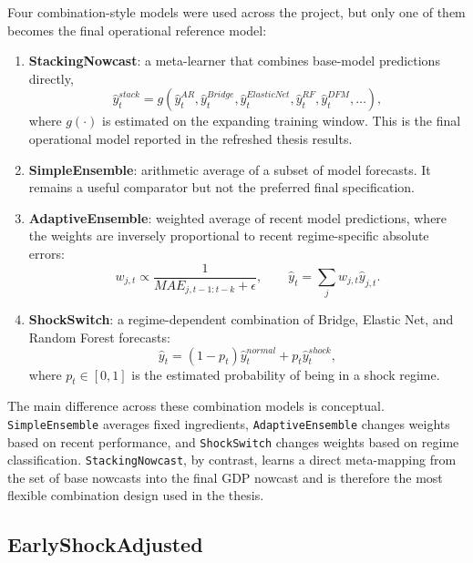 \documentclass[12pt,a4paper]{article}
\begin{document}
Four combination-style models were used across the project, but only one of them becomes the final operational reference model:
\begin{enumerate}
    \item \textbf{StackingNowcast}: a meta-learner that combines base-model predictions directly,
    \begin{equation}
        \hat{y}_t^{stack} = g\!\left(\hat{y}_t^{AR}, \hat{y}_t^{Bridge}, \hat{y}_t^{ElasticNet}, \hat{y}_t^{RF}, \hat{y}_t^{DFM}, \ldots \right),
    \end{equation}
    where $g(\cdot)$ is estimated on the expanding training window. This is the final operational model reported in the refreshed thesis results.
    \item \textbf{SimpleEnsemble}: arithmetic average of a subset of model forecasts. It remains a useful comparator but not the preferred final specification.
    \item \textbf{AdaptiveEnsemble}: weighted average of recent model predictions, where the weights are inversely proportional to recent regime-specific absolute errors:
    \begin{equation}
        w_{j,t} \propto \frac{1}{MAE_{j,t-1:t-k} + \epsilon}, \qquad
        \hat{y}_t = \sum_j w_{j,t}\hat{y}_{j,t}.
    \end{equation}
    \item \textbf{ShockSwitch}: a regime-dependent combination of Bridge, Elastic Net, and Random Forest forecasts:
    \begin{equation}
        \hat{y}_t = (1-p_t)\hat{y}^{normal}_t + p_t \hat{y}^{shock}_t,
    \end{equation}
    where $p_t \in [0,1]$ is the estimated probability of being in a shock regime.
\end{enumerate}

The main difference across these combination models is conceptual. \texttt{SimpleEnsemble} averages fixed ingredients, \texttt{AdaptiveEnsemble} changes weights based on recent performance, and \texttt{ShockSwitch} changes weights based on regime classification. \texttt{StackingNowcast}, by contrast, learns a direct meta-mapping from the set of base nowcasts into the final GDP nowcast and is therefore the most flexible combination design used in the thesis.

\subsection{EarlyShockAdjusted}
\end{document}

